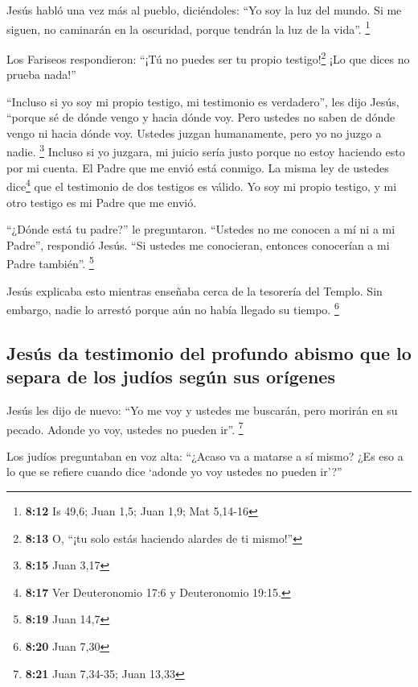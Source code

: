 Jesús habló una vez más al pueblo, diciéndoles: ``Yo soy
la luz del mundo. Si me siguen, no caminarán en la oscuridad, porque
tendrán la luz de la vida''. \footnote{\textbf{8:12} Is 49,6; Juan 1,5;
  Juan 1,9; Mat 5,14-16}

 Los Fariseos respondieron: ``¡Tú no puedes ser tu propio
testigo!\footnote{\textbf{8:13} O, ``¡tu solo estás haciendo alardes de
  ti mismo!''} ¡Lo que dices no prueba nada!''

 ``Incluso si yo soy mi propio testigo, mi testimonio es
verdadero'', les dijo Jesús, ``porque sé de dónde vengo y hacia dónde
voy. Pero ustedes no saben de dónde vengo ni hacia dónde voy.
 Ustedes juzgan humanamente, pero yo no juzgo a nadie.
\footnote{\textbf{8:15} Juan 3,17}  Incluso si yo
juzgara, mi juicio sería justo porque no estoy haciendo esto por mi
cuenta. El Padre que me envió está conmigo.  La misma ley
de ustedes dice\footnote{\textbf{8:17} Ver Deuteronomio 17:6 y
  Deuteronomio 19:15.} que el testimonio de dos testigos es válido.
 Yo soy mi propio testigo, y mi otro testigo es mi Padre
que me envió.

 ``¿Dónde está tu padre?'' le preguntaron. ``Ustedes no
me conocen a mí ni a mi Padre'', respondió Jesús. ``Si ustedes me
conocieran, entonces conocerían a mi Padre también''. \footnote{\textbf{8:19}
  Juan 14,7}

 Jesús explicaba esto mientras enseñaba cerca de la
tesorería del Templo. Sin embargo, nadie lo arrestó porque aún no había
llegado su tiempo. \footnote{\textbf{8:20} Juan 7,30}

\hypertarget{jesuxfas-da-testimonio-del-profundo-abismo-que-lo-separa-de-los-juduxedos-seguxfan-sus-oruxedgenes}{%
\subsection{Jesús da testimonio del profundo abismo que lo separa de los
judíos según sus
orígenes}\label{jesuxfas-da-testimonio-del-profundo-abismo-que-lo-separa-de-los-juduxedos-seguxfan-sus-oruxedgenes}}

 Jesús les dijo de nuevo: ``Yo me voy y ustedes me
buscarán, pero morirán en su pecado. Adonde yo voy, ustedes no pueden
ir''. \footnote{\textbf{8:21} Juan 7,34-35; Juan 13,33}

 Los judíos preguntaban en voz alta: ``¿Acaso va a
matarse a sí mismo? ¿Es eso a lo que se refiere cuando dice `adonde yo
voy ustedes no pueden ir'?''

